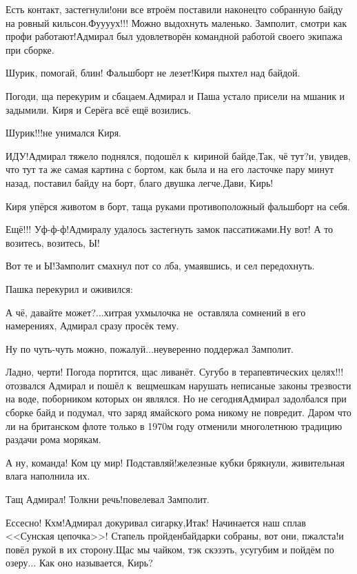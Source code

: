 \diagdash Есть контакт, застегнули!\mdash они все втроём поставили наконец\sdash то собранную байду на ровный кильсон.\mdash Фу\sdash у\sdash у\sdash ух!!! Можно выдохнуть маленько. Замполит, смотри как профи работают!\mdash Адмирал был удовлетворён командной работой своего экипажа при сборке.

\diagdash Шурик, помогай, блин! Фальшборт не лезет!\mdash Киря пыхтел над байдой.

\diagdash Погоди, ща перекурим и сбацаем.\mdash Адмирал и Паша устало присели на мшаник и задымили. Киря и Серёга всё ещё возились. 

\diagdash Шурик!!!\mdash не унимался Киря.

\diagdash ИДУ!\mdash Адмирал тяжело поднялся, подошёл к~кириной байде,\mdash Так, чё тут?\mdash и, увидев, что тут та же самая картина с бортом, как была и на его ласточке пару минут назад, поставил байду на борт, благо двушка легче.\mdash Дави, Кирь!

Киря упёрся животом в борт, таща руками противоположный фальшборт на себя.

\diagdash Ещё!!! Уф-ф-ф!\mdash Адмиралу удалось застегнуть замок пассатижами.\mdash Ну вот! А то возитесь, возитесь, Ы!

\diagdash Вот те и Ы!\mdash Замполит смахнул пот со лба, умаявшись, и сел передохнуть.

Пашка перекурил и оживился:

\diagdash А чё, давайте может?$\ldots$\mdash хитрая ухмылочка не~оставляла сомнений в его намерениях, Адмирал сразу просёк тему.

\diagdash Ну по чуть-чуть можно, пожалуй$\ldots$\mdash неуверенно поддержал Замполит.

\diagdash Ладно, черти! Погода портится, щас ливанёт. Сугубо в терапевтических целях!!!\mdash отозвался Адмирал и пошёл к~вещмешкам нарушать неписаные законы трезвости на воде, поборником которых он являлся. Но не сегодня\mdash Адмирал задолбался при сборке байд и подумал, что заряд ямайского рома никому не повредит. Даром что ли на британском флоте только в 1970\sdash м году отменили многолетнюю традицию раздачи рома морякам.

\diagdash А ну, команда! Ком цу мир! Подставляй!\mdash железные кубки брякнули, живительная влага наполнила их.

\diagdash Тащ Адмирал! Толкни речь!\mdash повелевал Замполит.

\diagdash Ессесно! Кхм!\mdash Адмирал докуривал сигарку,\mdash Итак! Начинается наш сплав <<Сунская цепочка>>! Стапель пройден\mdash байдарки собраны, вот они, пжалста!\mdash и повёл рукой в их сторону.\mdash Щас мы чайком, тэк скэзэть, усугубим и пойдём по озеру$\ldots$ Как оно называется, Кирь?

